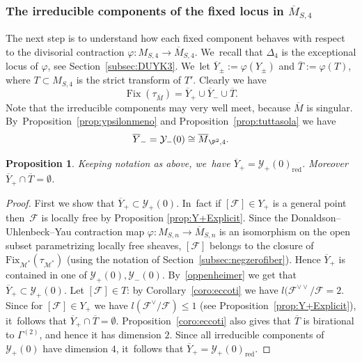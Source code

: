 \documentclass[JEP,XML,SOM,Unicode,published]{cedram}
\newcommand\cF{\mathcal{F}}
\newcommand\cM{\mathcal{M}}
\newcommand\cY{\mathcal{Y}}
\DeclareMathOperator{\Fix}{Fix}
\let\es\emptyset
\let\ov\overline
\let\phi\varphi
\newtheorem{prop}[lemm]{Proposition}
\theoremstyle{definition}
\begin{document}
\subsubsection*{The irreducible components of the fixed locus in $\overline{M}_{S,4}$}
The next step is to understand how each fixed component behaves with respect to the divisorial contraction $\phi\colon M_{S,4}\to \overline{M}_{S,4}$. We~recall that $\Delta_4$ is the exceptional locus of $\phi$, see Section~\ref{subsec:DUYK3}. We~let $\ov{Y}_{\pm}:=\phi(Y_{\pm})$ and $\ov{T}:=\phi(T)$, where $T\subset M_{S,4}$ is the strict transform of $T'$.
Clearly we have
\begin{equation*}
\Fix(\tau_{\ov{M}})=\ov{Y}_{+}\cup \ov{Y}_{-}\cup\ov{T}.
\end{equation*}
Note that the irreducible components may very well meet, because $\ov{M}$ is singular. By~Proposition~\ref{prop:ypsilonmeno} and Proposition~\ref{prop:tuttasola}
we have
\begin{equation}\label{oppenheimer}
\ov{Y}_{-}=\cY_{-}(0)\cong \ov{M}_{\P^2,4}.
\end{equation}

\begin{prop}\label{prp:bobbysolo}
Keeping notation as above, we~have $\ov{Y}_{+}=\cY_{+}(0)_\mathrm{
red}$. Moreover
$\ov{Y}_{+}\cap\ov{T}=\es$.
\end{prop}

\begin{proof}
First we show that $\ov{Y}_{+}\subset\cY_{+}(0)$. In~fact if $[\cF]\in Y_{+}$ is a general point then~$\cF$ is locally free by Proposition \ref{prop:Y+Explicit}. Since the Donaldson--Uhlenbeck--Yau contraction map $\varphi\colon M_{S,n}\to \overline{M}_{S,n}$ is an isomorphism on the open subset parametrizing locally free sheaves, $[\cF]$ belongs to the closure of $\mathrm{Fix}_{\cM^*}(\tau_{\cM^*})$ (using the notation of Section~\ref{subsec:negzerofiber}). Hence $\ov{Y}_{+}$ is contained in one of $\cY_{+}(0),\cY_{-}(0)$. By~\eqref{oppenheimer} we get that $\ov{Y}_{+}\subset\cY_{+}(0)$. Let $[\cF]\in T$: by Corollary~\ref{coro:eccoti}
we have $l(\cF^{\vee\vee}/\cF=2$. Since for $[\cF]\in Y_{+}$ we have $l(\cF^{\vee}/\cF)\le 1$ (see Proposition~\ref{prop:Y+Explicit}), it~follows that
$\ov{Y}_{+}\cap\ov{T}=\es$.
Proposition~\ref{coro:eccoti} also gives that $\ov{T}$ is birational to $\mathsf{\Gamma}^{(2)}$, and hence it has dimension $2$.
Since all irreducible components of $\cY_{+}(0)$ have dimension $4$, it~follows that $\ov{Y}_{+}=\cY_{+}(0)_\mathrm{red}$.
\end{proof}
\end{document}
